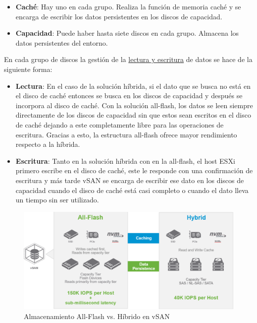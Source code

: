 \begin{itemize}
        \begin{itemize}
            \item \textbf{Caché}: Hay uno en cada grupo. Realiza la función de memoria caché y se encarga de escribir los datos persistentes en los discos de capacidad.
            \item \textbf{Capacidad}: Puede haber hasta siete discos en cada grupo. Almacena los datos persistentes del entorno.
        \end{itemize}
    En cada grupo de discos la gestión de la \underline{lectura y escritura} de datos se hace de la siguiente forma:
        \begin{itemize}
            \item \textbf{Lectura}: En el caso de la solución híbrida, si el dato que se busca no está en el disco de caché entonces se busca en los discos de capacidad y después se incorpora al disco de caché. Con la solución all-flash, los datos se leen siempre directamente de los discos de capacidad sin que estos sean escritos en el disco de caché dejando a este completamente libre para las operaciones de escritura. Gracias a esto, la estructura all-flash ofrece mayor rendimiento respecto a la híbrida.
            \item \textbf{Escritura}: Tanto en la solución híbrida con en la all-flash, el host ESXi primero escribe en el disco de caché, este le responde con una confirmación de escritura y más tarde vSAN se encarga de escribir ese dato en los discos de capacidad cuando el disco de caché está casi completo o cuando el dato lleva un tiempo sin ser utilizado.
        \end{itemize}
        \begin{figure}[h!]
            \centering
            \includegraphics[width=1\textwidth]{imaxes/cap2recursos/rendimientoVSAN.png}
            \caption{Almacenamiento All-Flash vs. Híbrido en vSAN}
            \label{fig:rendimientoVSAN}
        \end{figure}

\end{itemize}
